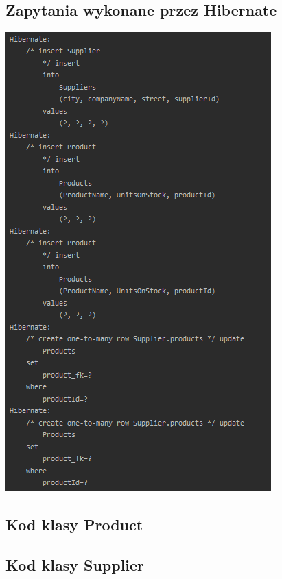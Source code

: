 \documentclass[a4paper, 11pt]{article}
\begin{document}
    \subsection{Zapytania wykonane przez Hibernate}
    \begin{center}
        \includegraphics[scale=1.3]{images/point4_without_additional_table/hibernateQueries.png}
    \end{center}

    \newpage

    \subsection{Kod klasy Product}
    

    \newpage

    \subsection{Kod klasy Supplier}
    
\end{document}
